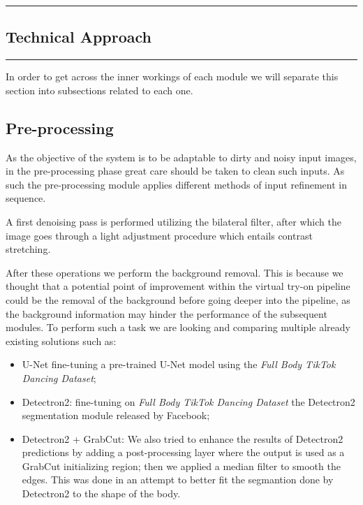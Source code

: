 {\color{gray}\hrule}
\begin{center}
\section{Technical Approach}
\end{center}
{\color{gray}\hrule}


\begin{multicols}{2}
In order to get across the inner workings of each module we will separate this section into subsections related to each one.

\subsection{Pre-processing}
As the objective of the system is to be adaptable to dirty and noisy input images, in the pre-processing phase great care should be taken to clean such inputs. As such the pre-processing module applies different methods of input refinement in sequence.

A first denoising pass is performed utilizing the bilateral filter, after which the image goes through a light adjustment procedure which entails contrast stretching.

After these operations we perform the background removal. This is because we thought that a potential point of improvement within the virtual try-on pipeline could be the removal of the background before going deeper into the pipeline, as the background information may hinder the performance of the subsequent modules. To perform such a task we are looking and comparing multiple already existing solutions such as:
\begin{itemize}
\item U-Net\cite{u-net} fine-tuning a pre-trained U-Net model using the \textit{Full Body TikTok Dancing Dataset}\cite{tik_tok_dataset};

\item Detectron2\cite{detectron2}: fine-tuning on \textit{Full Body TikTok Dancing Dataset} the Detectron2 segmentation module released by Facebook;

\item Detectron2 + GrabCut: We also tried to enhance the results of Detectron2 predictions by adding a post-processing layer where the output is used as a GrabCut initializing region; then we applied a median filter to smooth the edges. This was done in an attempt to better fit the segmantion done by Detectron2 to the shape of the body.
\end{itemize}


\end{multicols}
